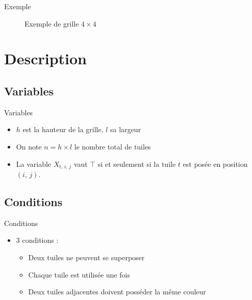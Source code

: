 \documentclass[aspectratio=43,11pt,hyperref={pdfpagemode=FullScreen}]{beamer}
\begin{document}
\begin{frame}{Exemple}
\begin{figure}[h!]
\begin{center}
\caption{Exemple de grille $4 \times 4$}
\end{center}
\end{figure}

\end{frame}

\section{Description}

\subsection{Variables}

\begin{frame}{Variables}
\begin{itemize}
    \item $h$ est la hauteur de la grille, $l$ sa largeur
    \item On note $n = h \times l$ le nombre total de tuiles
    \item La variable $X_{t, \, i, \, j}$ vaut $\top$ si et seulement si la tuile $t$ est posée en position $(i, \, j)$.
\end{itemize}
\end{frame}

\subsection{Conditions}

\begin{frame}{Conditions}
\begin{itemize}
    \item 3 conditions :
    \vspace{0,5 cm}
    \begin{itemize}
        \item Deux tuiles ne peuvent se superposer
        \item Chaque tuile est utilisée une fois
        \item Deux tuiles adjacentes doivent posséder la même couleur
    \end{itemize}
\end{itemize}
\end{frame}
\end{document}
